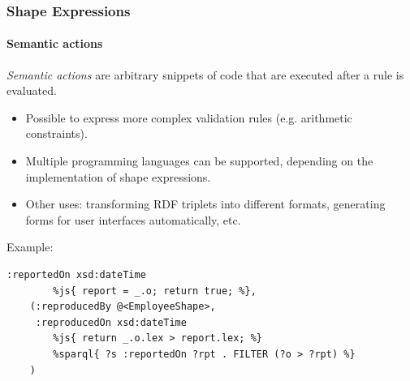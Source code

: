\documentclass{beamer}
\begin{document}
\begin{frame}[fragile]
  \frametitle{Shape Expressions}
  \framesubtitle{Semantic actions}

  \textit{Semantic actions} are arbitrary snippets of code that are executed
  after a rule is evaluated.

  \begin{itemize}
    \item Possible to express more complex validation rules (e.g. arithmetic
      constraints).

    \item Multiple programming languages can be supported, depending on the
      implementation of shape expressions.

    \item Other uses: transforming RDF triplets into different formats,
      generating forms for user interfaces automatically, etc.
  \end{itemize}

  \pause

  Example:

  \begin{Verbatim}[fontsize=\scriptsize]
    :reportedOn xsd:dateTime
        %js{ report = _.o; return true; %},
    (:reproducedBy @<EmployeeShape>,
     :reproducedOn xsd:dateTime
        %js{ return _.o.lex > report.lex; %}
        %sparql{ ?s :reportedOn ?rpt . FILTER (?o > ?rpt) %}
    )
  \end{Verbatim}
\end{frame}
\end{document}
